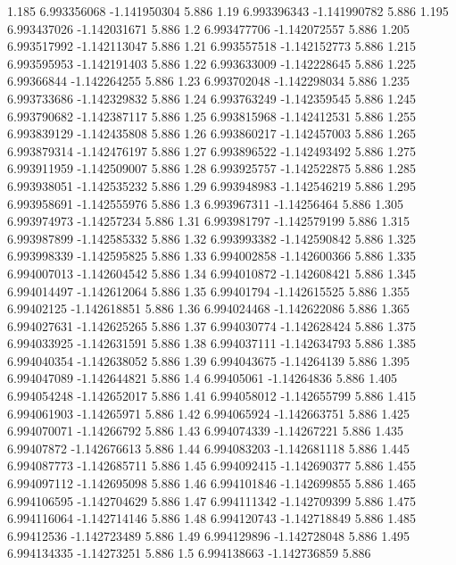 {1.185 6.993356068 -1.141950304 5.886
1.19 6.993396343 -1.141990782 5.886
1.195 6.993437026 -1.142031671 5.886
1.2 6.993477706 -1.142072557 5.886
1.205 6.993517992 -1.142113047 5.886
1.21 6.993557518 -1.142152773 5.886
1.215 6.993595953 -1.142191403 5.886
1.22 6.993633009 -1.142228645 5.886
1.225 6.99366844 -1.142264255 5.886
1.23 6.993702048 -1.142298034 5.886
1.235 6.993733686 -1.142329832 5.886
1.24 6.993763249 -1.142359545 5.886
1.245 6.993790682 -1.142387117 5.886
1.25 6.993815968 -1.142412531 5.886
1.255 6.993839129 -1.142435808 5.886
1.26 6.993860217 -1.142457003 5.886
1.265 6.993879314 -1.142476197 5.886
1.27 6.993896522 -1.142493492 5.886
1.275 6.993911959 -1.142509007 5.886
1.28 6.993925757 -1.142522875 5.886
1.285 6.993938051 -1.142535232 5.886
1.29 6.993948983 -1.142546219 5.886
1.295 6.993958691 -1.142555976 5.886
1.3 6.993967311 -1.14256464 5.886
1.305 6.993974973 -1.14257234 5.886
1.31 6.993981797 -1.142579199 5.886
1.315 6.993987899 -1.142585332 5.886
1.32 6.993993382 -1.142590842 5.886
1.325 6.993998339 -1.142595825 5.886
1.33 6.994002858 -1.142600366 5.886
1.335 6.994007013 -1.142604542 5.886
1.34 6.994010872 -1.142608421 5.886
1.345 6.994014497 -1.142612064 5.886
1.35 6.99401794 -1.142615525 5.886
1.355 6.99402125 -1.142618851 5.886
1.36 6.994024468 -1.142622086 5.886
1.365 6.994027631 -1.142625265 5.886
1.37 6.994030774 -1.142628424 5.886
1.375 6.994033925 -1.142631591 5.886
1.38 6.994037111 -1.142634793 5.886
1.385 6.994040354 -1.142638052 5.886
1.39 6.994043675 -1.14264139 5.886
1.395 6.994047089 -1.142644821 5.886
1.4 6.99405061 -1.14264836 5.886
1.405 6.994054248 -1.142652017 5.886
1.41 6.994058012 -1.142655799 5.886
1.415 6.994061903 -1.14265971 5.886
1.42 6.994065924 -1.142663751 5.886
1.425 6.994070071 -1.14266792 5.886
1.43 6.994074339 -1.14267221 5.886
1.435 6.99407872 -1.142676613 5.886
1.44 6.994083203 -1.142681118 5.886
1.445 6.994087773 -1.142685711 5.886
1.45 6.994092415 -1.142690377 5.886
1.455 6.994097112 -1.142695098 5.886
1.46 6.994101846 -1.142699855 5.886
1.465 6.994106595 -1.142704629 5.886
1.47 6.994111342 -1.142709399 5.886
1.475 6.994116064 -1.142714146 5.886
1.48 6.994120743 -1.142718849 5.886
1.485 6.99412536 -1.142723489 5.886
1.49 6.994129896 -1.142728048 5.886
1.495 6.994134335 -1.14273251 5.886
1.5 6.994138663 -1.142736859 5.886
}\leverevent
{}\leverconfirm
